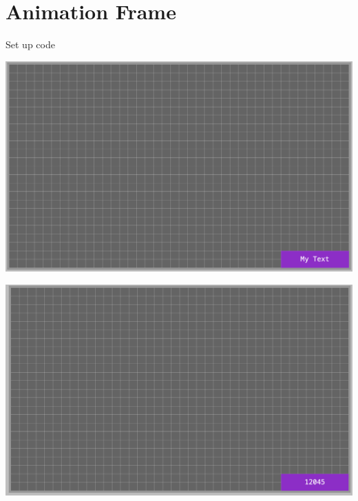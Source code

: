 \documentclass[a4paper,12pt]{article}
\begin{document}
\section{Animation Frame}
Set up code



\begin{center}
	\includegraphics[width=18cm, angle=0, origin=c]{animationframe/start_up.png}
\end{center}

\begin{center}
	\includegraphics[width=18cm, angle=0, origin=c,]{animationframe/animation_frame_running.png}
\end{center}
\newpage
\end{document}
